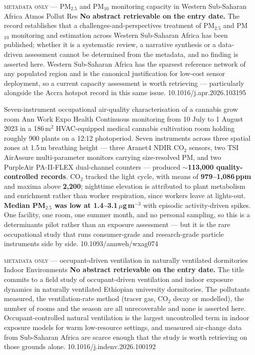 \documentclass[10pt]{article}
\begin{document}
{\textsc{metadata only} --- PM$_{2.5}$ and PM$_{10}$ monitoring capacity in Western
Sub-Saharan Africa}
{Atmos Pollut Res}
{\textbf{No abstract retrievable on the entry date.} The record establishes that a
challenges-and-perspectives treatment of PM$_{2.5}$ and PM$_{10}$ monitoring and estimation
across Western Sub-Saharan Africa has been published; whether it is a systematic review, a
narrative synthesis or a data-driven assessment cannot be determined from the metadata, and
no finding is asserted here. Western Sub-Saharan Africa has the sparsest reference network
of any populated region and is the canonical justification for low-cost sensor deployment, so
a current capacity assessment is worth retrieving --- particularly alongside the Accra
hotspot record in this same issue.}
{10.1016/j.apr.2026.103195}


{Seven-instrument occupational air-quality characterisation of a cannabis grow room}
{Ann Work Expo Health}
{Continuous monitoring from 10 July to 1 August 2023 in a 186\,m$^2$ HVAC-equipped medical
cannabis cultivation room holding roughly 900 plants on a 12:12 photoperiod. Seven
instruments across three spatial zones at 1.5\,m breathing height --- three Aranet4 NDIR
CO$_2$ sensors, two TSI AirAssure multi-parameter monitors carrying size-resolved PM, and two
PurpleAir PA-II-FLEX dual-channel counters --- produced \textbf{$\sim$113{,}000
quality-controlled records}. CO$_2$ tracked the light cycle, with means of
\textbf{979--1{,}086\,ppm} and maxima above \textbf{2{,}200}; nighttime elevation is
attributed to plant metabolism and enrichment rather than worker respiration, since workers
leave at lights-out. \textbf{Median PM$_{2.5}$ was low at 1.4--3.1\,$\mu$g\,m$^{-3}$} with
episodic activity-driven spikes. One facility, one room, one summer month, and no personal
sampling, so this is a determinants pilot rather than an exposure assessment --- but it is
the rare occupational study that runs consumer-grade and research-grade particle instruments
side by side.}
{10.1093/annweh/wxag074}

{\textsc{metadata only} --- occupant-driven ventilation in naturally ventilated dormitories}
{Indoor Environments}
{\textbf{No abstract retrievable on the entry date.} The title commits to a field study of
occupant-driven ventilation and indoor exposure dynamics in naturally ventilated Ethiopian
university dormitories. The pollutants measured, the ventilation-rate method (tracer gas,
CO$_2$ decay or modelled), the number of rooms and the season are all unrecoverable and none
is asserted here. Occupant-controlled natural ventilation is the largest uncontrolled term in
indoor exposure models for warm low-resource settings, and measured air-change data from
Sub-Saharan Africa are scarce enough that the study is worth retrieving on those grounds
alone.}
{10.1016/j.indenv.2026.100192}
\end{document}
